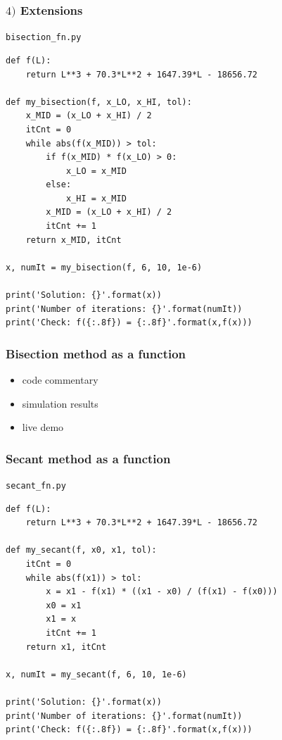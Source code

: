 \documentclass[english,14pt]{beamer}
\begin{document}

\begin{frame}[fragile]

\frametitle{$4)$ Extensions}

\texttt{bisection\_fn.py}
\begin{lstlisting}[style=CStyle,basicstyle=\scriptsize]
def f(L):
    return L**3 + 70.3*L**2 + 1647.39*L - 18656.72

def my_bisection(f, x_LO, x_HI, tol):
    x_MID = (x_LO + x_HI) / 2
    itCnt = 0
    while abs(f(x_MID)) > tol:
        if f(x_MID) * f(x_LO) > 0:
            x_LO = x_MID
        else:
            x_HI = x_MID
        x_MID = (x_LO + x_HI) / 2
        itCnt += 1
    return x_MID, itCnt

x, numIt = my_bisection(f, 6, 10, 1e-6)

print('Solution: {}'.format(x))
print('Number of iterations: {}'.format(numIt))
print('Check: f({:.8f}) = {:.8f}'.format(x,f(x)))
\end{lstlisting}

\end{frame}


\begin{frame}[fragile]

\frametitle{Bisection method as a function}

\begin{itemize}
	\item code commentary
	\item simulation results
	\item live demo
\end{itemize}

\end{frame}


\begin{frame}[fragile]

\frametitle{Secant method as a function}

\texttt{secant\_fn.py}
\begin{lstlisting}[style=CStyle,basicstyle=\scriptsize]
def f(L):
    return L**3 + 70.3*L**2 + 1647.39*L - 18656.72

def my_secant(f, x0, x1, tol):
    itCnt = 0
    while abs(f(x1)) > tol:
        x = x1 - f(x1) * ((x1 - x0) / (f(x1) - f(x0)))
        x0 = x1
        x1 = x
        itCnt += 1
    return x1, itCnt

x, numIt = my_secant(f, 6, 10, 1e-6)

print('Solution: {}'.format(x))
print('Number of iterations: {}'.format(numIt))
print('Check: f({:.8f}) = {:.8f}'.format(x,f(x)))
\end{lstlisting}

\end{frame}
\end{document}
